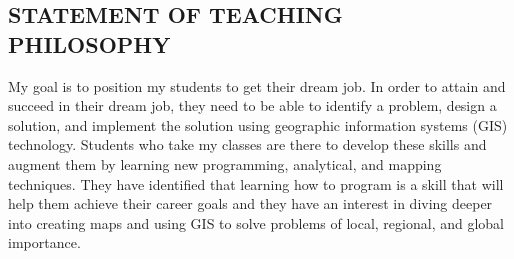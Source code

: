 \documentclass{res}
\begin{document}
\begin{resume}
\section{STATEMENT OF TEACHING PHILOSOPHY}
My goal is to position my students to get their dream job. In order to attain and succeed in their dream job, they need to be able to identify a problem, design a solution, and implement the solution using geographic information systems (GIS) technology. Students who take my classes are there to develop these skills and augment them by learning  new programming, analytical, and mapping techniques. They have identified that learning how to program is a skill that will help them achieve their career goals and they have an interest in diving deeper into creating maps and using GIS to solve problems of local, regional, and global importance.


\end{resume}
\end{document}
